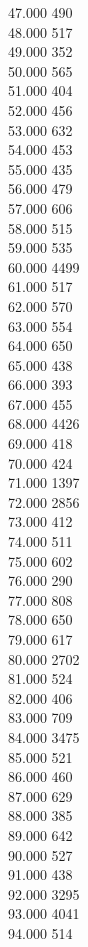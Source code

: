{ 47.000	490 \\
 48.000	517 \\
 49.000	352 \\
 50.000	565 \\
 51.000	404 \\
 52.000	456 \\
 53.000	632 \\
 54.000	453 \\
 55.000	435 \\
 56.000	479 \\
 57.000	606 \\
 58.000	515 \\
 59.000	535 \\
 60.000	4499 \\
 61.000	517 \\
 62.000	570 \\
 63.000	554 \\
 64.000	650 \\
 65.000	438 \\
 66.000	393 \\
 67.000	455 \\
 68.000	4426 \\
 69.000	418 \\
 70.000	424 \\
 71.000	1397 \\
 72.000	2856 \\
 73.000	412 \\
 74.000	511 \\
 75.000	602 \\
 76.000	290 \\
 77.000	808 \\
 78.000	650 \\
 79.000	617 \\
 80.000	2702 \\
 81.000	524 \\
 82.000	406 \\
 83.000	709 \\
 84.000	3475 \\
 85.000	521 \\
 86.000	460 \\
 87.000	629 \\
 88.000	385 \\
 89.000	642 \\
 90.000	527 \\
 91.000	438 \\
 92.000	3295 \\
 93.000	4041 \\
 94.000	514 \\
}
